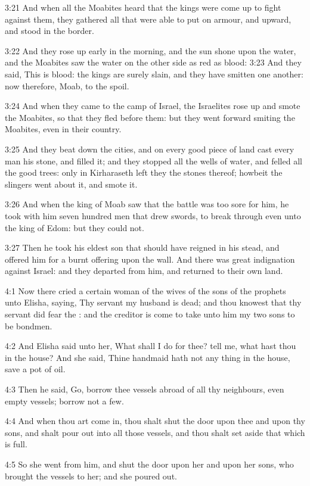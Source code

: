 3:21 And when all the Moabites heard that the kings were come up to
fight against them, they gathered all that were able to put on armour,
and upward, and stood in the border.

3:22 And they rose up early in the morning, and the sun shone upon the
water, and the Moabites saw the water on the other side as red as
blood: 3:23 And they said, This is blood: the kings are surely slain,
and they have smitten one another: now therefore, Moab, to the spoil.

3:24 And when they came to the camp of Israel, the Israelites rose up
and smote the Moabites, so that they fled before them: but they went
forward smiting the Moabites, even in their country.

3:25 And they beat down the cities, and on every good piece of land
cast every man his stone, and filled it; and they stopped all the
wells of water, and felled all the good trees: only in Kirharaseth
left they the stones thereof; howbeit the slingers went about it, and
smote it.

3:26 And when the king of Moab saw that the battle was too sore for
him, he took with him seven hundred men that drew swords, to break
through even unto the king of Edom: but they could not.

3:27 Then he took his eldest son that should have reigned in his
stead, and offered him for a burnt offering upon the wall. And there
was great indignation against Israel: and they departed from him, and
returned to their own land.

4:1 Now there cried a certain woman of the wives of the sons of the
prophets unto Elisha, saying, Thy servant my husband is dead; and thou
knowest that thy servant did fear the \LORD: and the creditor is come
to take unto him my two sons to be bondmen.

4:2 And Elisha said unto her, What shall I do for thee? tell me, what
hast thou in the house? And she said, Thine handmaid hath not any
thing in the house, save a pot of oil.

4:3 Then he said, Go, borrow thee vessels abroad of all thy
neighbours, even empty vessels; borrow not a few.

4:4 And when thou art come in, thou shalt shut the door upon thee and
upon thy sons, and shalt pour out into all those vessels, and thou
shalt set aside that which is full.

4:5 So she went from him, and shut the door upon her and upon her
sons, who brought the vessels to her; and she poured out.

